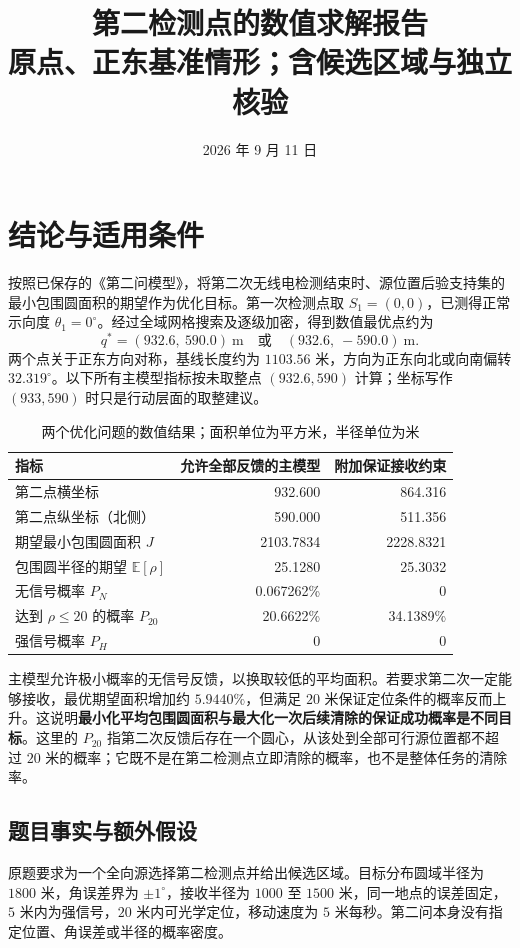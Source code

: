 \documentclass[UTF8,a4paper,zihao=5,fontset=none]{ctexart}
\title{第二检测点的数值求解报告\\\large 原点、正东基准情形；含候选区域与独立核验}
\author{}\date{2026 年 9 月 11 日}
\newcommand{\E}{\mathbb E}\newcommand{\Prob}{\mathbb P}
\begin{document}
\maketitle\vspace{-2em}
\section{结论与适用条件}
按照已保存的《第二问模型》，将第二次无线电检测结束时、源位置后验支持集的最小包围圆面积的期望作为优化目标。第一次检测点取 \(S_1=(0,0)\)，已测得正常示向度 \(\theta_1=0^\circ\)。经过全域网格搜索及逐级加密，得到数值最优点约为
\[
 q^*=(932.6,\ 590.0)\ \mathrm m
 \quad\text{或}\quad (932.6,\ -590.0)\ \mathrm m.
\]
两个点关于正东方向对称，基线长度约为 \(1103.56\) 米，方向为正东向北或向南偏转 \(32.319^\circ\)。以下所有主模型指标按未取整点 \((932.6,590)\) 计算；坐标写作 \((933,590)\) 时只是行动层面的取整建议。

\begin{table}[H]\centering\small
\caption{两个优化问题的数值结果；面积单位为平方米，半径单位为米}
\begin{tabular}{lrr}\toprule
指标 & 允许全部反馈的主模型 & 附加保证接收约束 \\\midrule
第二点横坐标 & 932.600 & 864.316 \\
第二点纵坐标（北侧） & 590.000 & 511.356 \\
期望最小包围圆面积 \(J\) & 2103.7834 & 2228.8321 \\
包围圆半径的期望 \(\E[\rho]\) & 25.1280 & 25.3032 \\
无信号概率 \(P_N\) & 0.067262\% & 0 \\
达到 \(\rho\le20\) 的概率 \(P_{20}\) & 20.6622\% & 34.1389\% \\
强信号概率 \(P_H\) & 0 & 0 \\\bottomrule
\end{tabular}
\end{table}
主模型允许极小概率的无信号反馈，以换取较低的平均面积。若要求第二次一定能够接收，最优期望面积增加约 \(5.9440\%\)，但满足 \(20\) 米保证定位条件的概率反而上升。这说明\textbf{最小化平均包围圆面积与最大化一次后续清除的保证成功概率是不同目标}。这里的 \(P_{20}\) 指第二次反馈后存在一个圆心，从该处到全部可行源位置都不超过 \(20\) 米的概率；它既不是在第二检测点立即清除的概率，也不是整体任务的清除率。

\subsection{题目事实与额外假设}
原题要求为一个全向源选择第二检测点并给出候选区域。目标分布圆域半径为 \(1800\) 米，角误差界为 \(\pm1^\circ\)，接收半径为 \(1000\) 至 \(1500\) 米，同一地点的误差固定，\(5\) 米内为强信号，\(20\) 米内可光学定位，移动速度为 \(5\) 米每秒。第二问本身没有指定位置、角误差或半径的概率密度。
\end{document}

